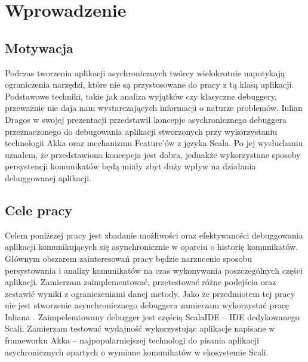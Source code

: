 \chapter{Wprowadzenie}


\section{Motywacja}

Podczas tworzenia aplikacji asychronicznych twórcy wielokrotnie napotykają ograniczenia narzędzi, które nie są przystosowane do pracy z tą klasą aplikacji. Podstawowe techniki, takie jak analiza wyjątków czy klasyczne debuggery, przeważnie nie daja nam wystarczających informacji o naturze problemów. Iulian Dragos w swojej prezentacji  \cite{rethingningDebugger} przedstawił koncepje asychronicznego debuggera przeznaczonego do debugowania aplikacji stworzonych przy wykorzystaniu technologii Akka oraz mechanizmu Feature'ów z języka Scala. Po jej wysłuchaniu uznałem, że przedstawiona koncepcja jest dobra, jednakże wykorzystane sposoby persystencji komunikatów będą miały zbyt duży wpływ na działania debuggowanej aplikacji.



\section{Cele pracy}

Celem poniższej pracy jest zbadanie możliwości oraz efektywaności debuggowania aplikacji komunikujących się asynchronicznie w oparciu o historię komunikatów. Głównym obszarem zainteresowań pracy będzie narzucenie sposobu persystowania i analizy komunikatów na czas wykonywania poszczególnych części aplikacji. Zamierzam zaimplementować, przetestować różne podejścia oraz zestawić wyniki z ograniczeniami danej metody. Jako że przedmiotem tej pracy nie jest stworzenie asynchronicznego debuggera zamierzam wykorzystać pracę Iuliana \cite{asychDebuggerGh}. Zaimpelemtowany debugger jest częścią ScalaIDE – IDE dedykowanego Scali. Zamierzam testować wydajność wykorzystując aplikacje napisane w frameworku Akka – najpopularniejszej technologi do pisania aplikacji asychronicznych opartych o wymiane komunikatów w ekosystemie Scali.













